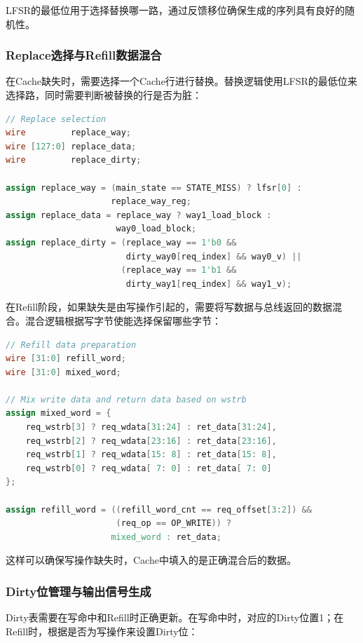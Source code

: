 \documentclass[11pt]{article}
\begin{document}
LFSR的最低位用于选择替换哪一路，通过反馈移位确保生成的序列具有良好的随机性。

\subsubsection{Replace选择与Refill数据混合}

在Cache缺失时，需要选择一个Cache行进行替换。替换逻辑使用LFSR的最低位来选择路，同时需要判断被替换的行是否为脏：

\begin{lstlisting}[language=Verilog]
// Replace selection
wire         replace_way;
wire [127:0] replace_data;
wire         replace_dirty;

assign replace_way = (main_state == STATE_MISS) ? lfsr[0] : 
                     replace_way_reg;
assign replace_data = replace_way ? way1_load_block : 
                      way0_load_block;
assign replace_dirty = (replace_way == 1'b0 && 
                        dirty_way0[req_index] && way0_v) ||
                       (replace_way == 1'b1 && 
                        dirty_way1[req_index] && way1_v);
\end{lstlisting}

在Refill阶段，如果缺失是由写操作引起的，需要将写数据与总线返回的数据混合。混合逻辑根据写字节使能选择保留哪些字节：

\begin{lstlisting}[language=Verilog]
// Refill data preparation
wire [31:0] refill_word;
wire [31:0] mixed_word;

// Mix write data and return data based on wstrb
assign mixed_word = {
    req_wstrb[3] ? req_wdata[31:24] : ret_data[31:24],
    req_wstrb[2] ? req_wdata[23:16] : ret_data[23:16],
    req_wstrb[1] ? req_wdata[15: 8] : ret_data[15: 8],
    req_wstrb[0] ? req_wdata[ 7: 0] : ret_data[ 7: 0]
};

assign refill_word = ((refill_word_cnt == req_offset[3:2]) && 
                      (req_op == OP_WRITE)) ?
                     mixed_word : ret_data;
\end{lstlisting}

这样可以确保写操作缺失时，Cache中填入的是正确混合后的数据。

\subsubsection{Dirty位管理与输出信号生成}

Dirty表需要在写命中和Refill时正确更新。在写命中时，对应的Dirty位置1；在Refill时，根据是否为写操作来设置Dirty位：
\end{document}
